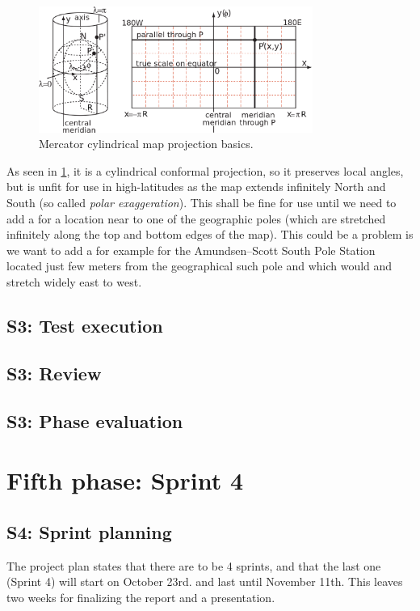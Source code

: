 \documentclass[11pt]{book}
\begin{document}
\begin{figure}[H]
    \centering
    \includegraphics[width=0.8\textwidth]{Figures/Prestudy/mercator.png}
    \caption{Mercator cylindrical map projection basics. \cite{wikipedia:mercator}}
    \label{fig:mercator}
\end{figure}

As seen in \ref{fig:mercator}, it is a cylindrical conformal projection, so it preserves local angles, but is unfit for use in high-latitudes as the map extends infinitely North and South (so called \emph{polar exaggeration}). This shall be fine for use until we need to add a \wallentitys for a location near to one of the geographic poles (which are stretched infinitely along the top and bottom edges of the map). This could be a problem is we want to add a \wallentitys for example for the Amundsen–Scott South Pole Station located just few meters from the geographical such pole and which would and stretch widely east to west. \cite{progonos:mercator,radicalcartography} 


\subsection{S3: Test execution}
\subsection{S3: Review}
\subsection{S3: Phase evaluation}

\section{Fifth phase: Sprint 4}

\subsection{S4: Sprint planning}
The project plan states that there are to be 4 sprints, and that the last one (Sprint 4) will start on October 23rd. and last until November 11th. This leaves two weeks for finalizing the report and a presentation.
\end{document}
